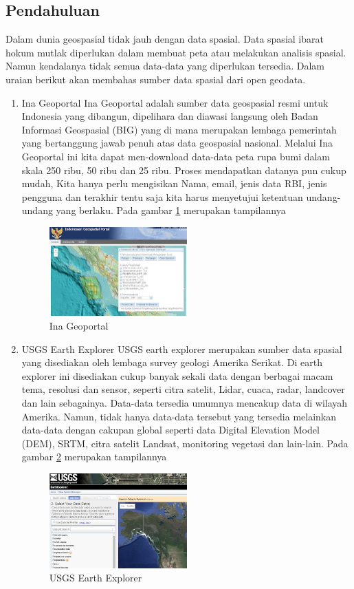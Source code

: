 \subsection{Pendahuluan}
Dalam dunia geospasial tidak jauh dengan data spasial. Data spasial ibarat hokum mutlak diperlukan dalam membuat peta atau melakukan analisis spasial. Namun kendalanya tidak semua data-data yang diperlukan tersedia. Dalam uraian berikut akan membahas sumber data spasial dari open geodata.
\begin{enumerate}
\item Ina Geoportal
Ina Geoportal adalah sumber data geospasial resmi untuk Indonesia yang  dibangun, dipelihara dan diawasi langsung oleh Badan Informasi Geospasial (BIG) yang di mana merupakan lembaga pemerintah yang bertanggung jawab penuh atas data geospasial nasional. Melalui Ina Geoportal ini kita dapat men-download data-data peta rupa bumi dalam skala 250 ribu, 50 ribu dan 25 ribu. Proses mendapatkan datanya pun cukup mudah, Kita hanya perlu mengisikan Nama, email, jenis data RBI, jenis pengguna dan terakhir tentu saja kita harus menyetujui ketentuan undang-undang yang berlaku. Pada gambar \ref{labelgambar1} merupakan tampilannya  
\begin{figure}[ht]
\centering
\includegraphics[width=0.5\textwidth]{pictures/ina_geospasial}
\caption{Ina Geoportal}
\label{labelgambar1}
\end{figure}

\item USGS Earth Explorer
USGS earth explorer merupakan sumber data spasial yang disediakan oleh lembaga survey geologi Amerika Serikat. Di earth explorer ini disediakan cukup banyak sekali data dengan berbagai macam tema, resolusi dan sensor, seperti citra satelit, Lidar, cuaca, radar, landcover dan lain sebagainya. Data-data tersedia umumnya mencakup data di wilayah Amerika. Namun, tidak hanya data-data tersebut yang tersedia melainkan data-data dengan cakupan global seperti data Digital Elevation Model (DEM), SRTM, citra satelit Landsat, monitoring vegetasi dan lain-lain.  Pada gambar \ref{labelgambar2} merupakan tampilannya  
\begin{figure}[ht]
\centering
\includegraphics[width=0.5\textwidth]{pictures/usgs_earth_explorer}
\caption{USGS Earth Explorer}
\label{labelgambar2}
\end{figure}



\end{enumerate}

